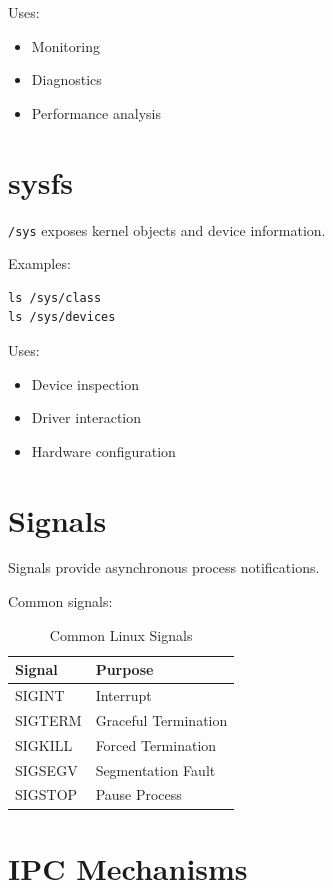Uses:

\begin{itemize}
\item Monitoring
\item Diagnostics
\item Performance analysis
\end{itemize}

\section{sysfs}

\texttt{/sys} exposes kernel objects and device information.

Examples:

\begin{lstlisting}[style=interviewcode]
ls /sys/class
ls /sys/devices
\end{lstlisting}

Uses:

\begin{itemize}
\item Device inspection
\item Driver interaction
\item Hardware configuration
\end{itemize}

\section{Signals}

Signals provide asynchronous process notifications.

Common signals:

\begin{table}[H]
\centering
\begin{tabular}{ll}
\toprule
Signal & Purpose \\
\midrule
SIGINT & Interrupt \\
SIGTERM & Graceful Termination \\
SIGKILL & Forced Termination \\
SIGSEGV & Segmentation Fault \\
SIGSTOP & Pause Process \\
\bottomrule
\end{tabular}
\caption{Common Linux Signals}
\end{table}

\section{IPC Mechanisms}

